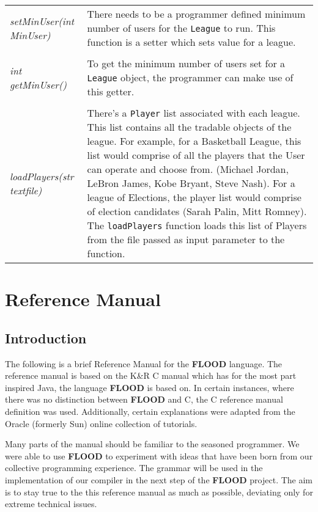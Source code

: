 \documentclass[12pt]{report}
\begin{document}
\begin{doublespace}
\begin{flushleft}
\begin{onehalfspace}
\begin{tabular}[pos]{ l | p{11cm} }
\\
\textit{setMinUser(int MinUser)} & There needs to be a programmer defined minimum number of users for the \texttt{League} to run. This function is a setter which sets value for a league. \\
\\
\textit{int getMinUser()} & To get the minimum number of users set for a \texttt{League} object, the programmer can make use of this getter. \\
\\
\textit{loadPlayers(str textfile)} & There's a \texttt{Player} list associated with each league. This list contains all the tradable objects of the league. For example, for a Basketball League, this list would comprise of all the players that the User can operate and choose from. (Michael Jordan, LeBron James, Kobe Bryant, Steve Nash). For a league of Elections, the player list would comprise of election candidates (Sarah Palin, Mitt Romney). The \texttt{loadPlayers} function loads this list of Players from the file passed as input parameter to the function. \\
\hline
\end{tabular}
\end{onehalfspace}
\end{flushleft}
\end{doublespace}

\chapter{Reference Manual}

\section{Introduction}

\begin{doublespace}
The following is a brief Reference Manual for the \textbf{FLOOD} language. The reference manual is based on the K\&R C manual which has for the most part inspired Java, the language \textbf{FLOOD} is based on. In certain instances, where there was no distinction between \textbf{FLOOD} and C, the C reference manual definition was used. Additionally, certain explanations were adapted from the Oracle (formerly Sun) online collection of tutorials. 

Many parts of the manual should be familiar to the seasoned programmer. We were able to use \textbf{FLOOD} to experiment with ideas that have been born from our collective programming experience. The grammar will be used in the implementation of our compiler in the next step of the \textbf{FLOOD} project. The aim is to stay true to the this reference manual as much as possible, deviating only for extreme technical issues. 
\end{doublespace}
\end{document}
